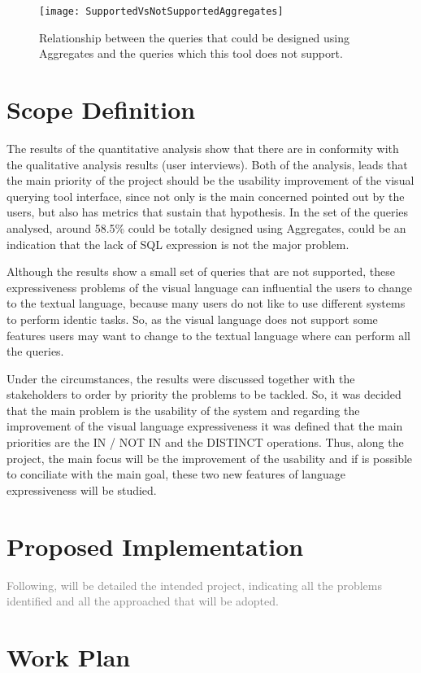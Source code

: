 \begin{figure}[htbp]
	\centering
	\texttt{[image: SupportedVsNotSupportedAggregates]}
	\caption{Relationship between the queries that could be designed using Aggregates and the queries which this tool does not support.}
	\label{fig:aggregates_supported_vs_not_supported_stats}
\end{figure}

\section{Scope Definition}
\label{sec:scope_definition}
The results of the quantitative analysis show that there are in conformity with the qualitative analysis results (user interviews). Both of the analysis, leads that the main priority of the project should be the usability improvement of the visual querying tool interface, since not only is the main concerned pointed out by the users, but also has metrics that sustain that hypothesis. In the set of the queries analysed, around 58.5\% could be totally designed using Aggregates, could be an indication that the lack of SQL expression is not the major problem.

Although the results show a small set of queries that are not supported, these expressiveness problems of the visual language can influential the users to change to the textual language, because many users do not like to use different systems to perform identic tasks. So, as the visual language does not support some features users may want to change to the textual language where can perform all the queries.

Under the circumstances, the results were discussed together with the stakeholders to order by priority the problems to be tackled. So, it was decided that the main problem is the usability of the system and regarding the improvement of the visual language expressiveness it was defined that the main priorities are the IN / NOT IN and the DISTINCT operations. Thus, along the project, the main focus will be the improvement of the usability and if is possible to conciliate with the main goal, these two new features of language expressiveness will be studied.

\section{Proposed Implementation}
\label{sec:proposed_implementation}
\textcolor{gray}{Following, will be detailed the intended project, indicating all the problems identified and all the approached that will be adopted.}

\section{Work Plan}
\label{sec:work_plan}

